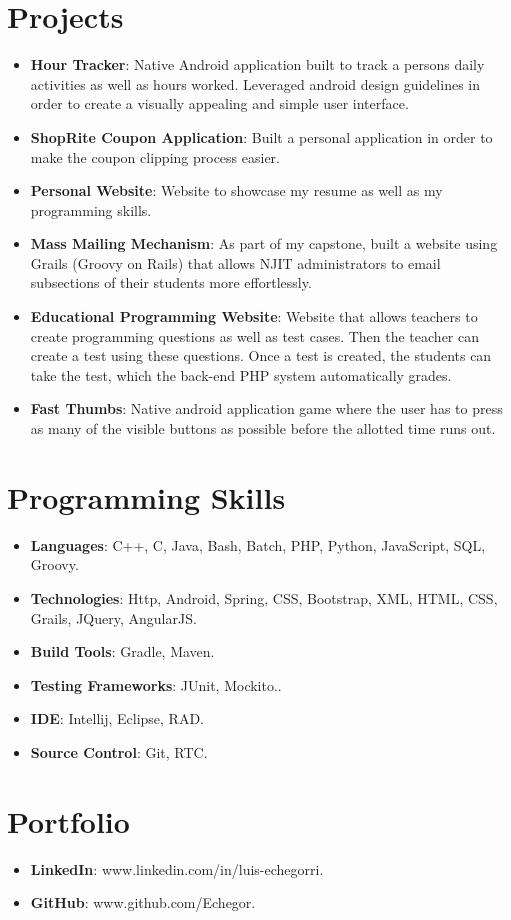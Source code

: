 \documentclass[letterpaper,11pt]{article}
\newcommand{\resumeItem}[2]{
  \item\small{
    \textbf{#1}{: #2 \vspace{-2pt}}
  }
}
\newcommand{\resumeSubItem}[2]{\resumeItem{#1}{#2}\vspace{-4pt}}
\newcommand{\resumeSubHeadingListStart}{\begin{itemize}[leftmargin=*]}
\newcommand{\resumeSubHeadingListEnd}{\end{itemize}}
\begin{document}
\section{Projects}
  \resumeSubHeadingListStart
    \resumeSubItem{Hour Tracker}
      {Native Android application built to track a persons daily activities as well as hours worked. Leveraged android design guidelines in order to create a visually appealing and simple user interface.}
    \resumeSubItem{ShopRite Coupon Application}
      {Built a personal application in order to make the coupon clipping process easier.}
    \resumeSubItem{Personal Website}
      {Website to showcase my resume as well as my programming skills.}
    \resumeSubItem{Mass Mailing Mechanism}
      {As part of my capstone, built a website using Grails (Groovy on Rails) that allows NJIT administrators to email subsections of their students more effortlessly.}
    \resumeSubItem{Educational Programming Website}
      {Website that allows teachers to create programming questions as well as test cases. Then the teacher can create a test using these questions. Once a test is created, the students can take the test, which the back-end PHP system automatically grades.} 
    \resumeSubItem{Fast Thumbs}
      {Native android application game where the user has to press as many of the visible buttons as possible before the allotted time runs out.}  
  \resumeSubHeadingListEnd
  
\section{Programming Skills}
  \resumeSubHeadingListStart
    \resumeSubItem{Languages}
      {C++, C, Java, Bash, Batch, PHP, Python, JavaScript, SQL, Groovy.}
    \resumeSubItem{Technologies}
      {Http, Android, Spring, CSS, Bootstrap, XML, HTML, CSS, Grails, JQuery, AngularJS.}
    \resumeSubItem{Build Tools}
      {Gradle, Maven.}
    \resumeSubItem{Testing Frameworks}
      {JUnit, Mockito..}
    \resumeSubItem{IDE}
      {Intellij, Eclipse, RAD.}
    \resumeSubItem{Source Control}
      {Git, RTC.}  
  \resumeSubHeadingListEnd
  
\section{Portfolio}
  \resumeSubHeadingListStart
    \resumeSubItem{LinkedIn}
      {www.linkedin.com/in/luis-echegorri.}
    \resumeSubItem{GitHub}
      {www.github.com/Echegor.}
  \resumeSubHeadingListEnd  
  
\end{document}
